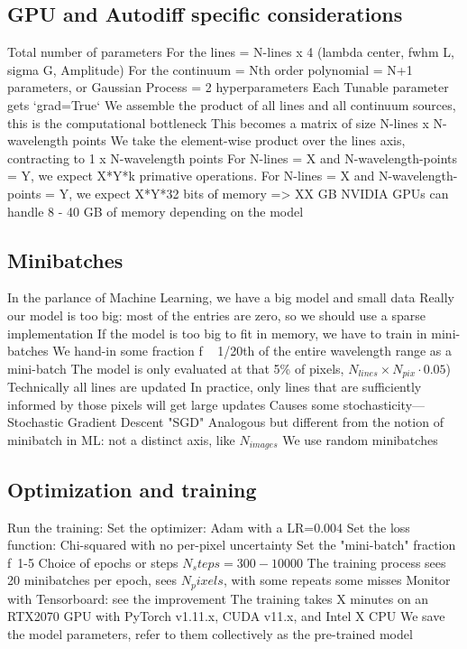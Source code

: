 \documentclass[modern]{aastex631}
\begin{document}
\subsection{GPU and Autodiff specific considerations}
\begin{outline}
  \1 Total number of parameters
  \2 For the lines =  N-lines x 4 (lambda center, fwhm L, sigma G, Amplitude)
  \2 For the continuum = Nth order polynomial = N+1 parameters, or Gaussian Process = 2 hyperparameters
  \1 Each Tunable parameter gets `grad=True`
  \1 We assemble the product of all lines and all continuum sources, this is the computational bottleneck
  \1 This becomes a matrix of size N-lines x N-wavelength points
  \1 We take the element-wise product over the lines axis, contracting to 1 x N-wavelength points
  \1 For N-lines = X and N-wavelength-points = Y, we expect X*Y*k primative operations.
  \1 For N-lines = X and N-wavelength-points = Y, we expect X*Y*32 bits of memory => XX GB
  \1 NVIDIA GPUs can handle 8 - 40 GB of memory depending on the model
\end{outline}

\subsection{Minibatches}
\begin{outline}
  \1 In the parlance of Machine Learning, we have a big model and small data
  \1 Really our model is too big: most of the entries are zero, so we should use a sparse implementation
  \1 If the model is too big to fit in memory, we have to train in mini-batches
  \1 We hand-in some fraction f ~ 1/20th of the entire wavelength range as a mini-batch
  \1 The model is only evaluated at that 5\% of pixels,  $N_{lines} \times N_{pix} \cdot 0.05$)
  \1 Technically all lines are updated
  \1 In practice, only lines that are sufficiently informed by those pixels will get large updates
  \1 Causes some stochasticity--- Stochastic Gradient Descent "SGD"
  \1 Analogous but different from the notion of minibatch in ML: not a distinct axis, like $N_{images}$
  \1 We use random minibatches
\end{outline}

\subsection{Optimization and training}
\begin{outline}
  \1 Run the training:
  \1 Set the optimizer: Adam with a LR=0.004
  \1 Set the loss function: Chi-squared with no per-pixel uncertainty
  \1 Set the "mini-batch" fraction f~1-5%
  \1 Choice of epochs or steps $N_steps = 300-10000$
  \1 The training process sees 20 minibatches per epoch, sees $N_pixels$, with some repeats some misses
  \1 Monitor with Tensorboard: see the improvement
  \1 The training takes X minutes on an RTX2070 GPU with PyTorch v1.11.x, CUDA v11.x, and Intel X CPU
  \1 We save the model parameters, refer to them collectively as the pre-trained model
\end{outline}
\end{document}
